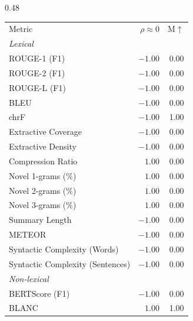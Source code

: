 \begin{table}[htbp]
\centering
\footnotesize
\setlength{\tabcolsep}{4pt}
\begin{subtable}[t]{0.48\textwidth}
\centering
\begin{tabular}{lrr}
& & \\
\toprule
Metric & $\rho\approx0$ & M$\uparrow$ \\
\midrule
\multicolumn{3}{l}{\textit{Lexical}} \\
\midrule
\rowcolor{matchFalse} ROUGE-1 (F1)                          &  $-1.00$ &  0.00 \\
\rowcolor{matchFalse} ROUGE-2 (F1)                          &  $-1.00$ &  0.00 \\
\rowcolor{matchFalse} ROUGE-L (F1)                          &  $-1.00$ &  0.00 \\
\rowcolor{matchFalse} BLEU                                  &  $-1.00$ &  0.00 \\
\rowcolor{matchFalse} chrF                                  &  $-1.00$ &  1.00 \\
\rowcolor{matchFalse} Extractive Coverage                   &  $-1.00$ &  0.00 \\
\rowcolor{matchFalse} Extractive Density                    &  $-1.00$ &  0.00 \\
\rowcolor{matchFalse} Compression Ratio                     &   $1.00$ &  0.00 \\
\rowcolor{matchFalse} Novel 1-grams (\%)                    &   $1.00$ &  0.00 \\
\rowcolor{matchFalse} Novel 2-grams (\%)                    &   $1.00$ &  0.00 \\
\rowcolor{matchFalse} Novel 3-grams (\%)                    &   $1.00$ &  0.00 \\
\rowcolor{matchFalse} Summary Length                        &  $-1.00$ &  0.00 \\
\rowcolor{matchFalse} METEOR                                &  $-1.00$ &  0.00 \\
\rowcolor{matchFalse} Syntactic Complexity (Words)          &  $-1.00$ &  0.00 \\
\rowcolor{matchFalse} Syntactic Complexity (Sentences)      &  $-1.00$ &  0.00 \\
\midrule
\multicolumn{3}{l}{\textit{Non-lexical}} \\
\midrule
\rowcolor{matchFalse} BERTScore (F1)                        &  $-1.00$ &  0.00 \\
\rowcolor{matchFalse} BLANC                                 &   $1.00$ &  1.00 \\

\end{tabular}
\end{subtable}
\end{table}
